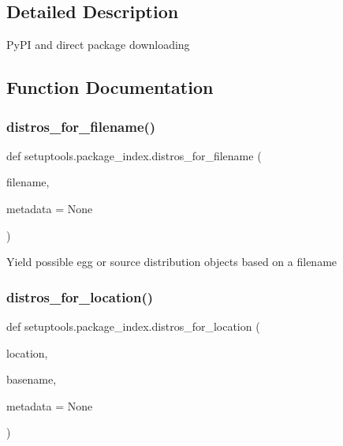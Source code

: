 \subsection{Detailed Description}
\begin{DoxyVerb}PyPI and direct package downloading\end{DoxyVerb}
 

\subsection{Function Documentation}
\mbox{\label{namespacesetuptools_1_1package__index_a2038c36ec69098c4da6c0fce1550f080}} 
\subsubsection{\texorpdfstring{distros\+\_\+for\+\_\+filename()}{distros\_for\_filename()}}
{\footnotesize\ttfamily def setuptools.\+package\+\_\+index.\+distros\+\_\+for\+\_\+filename (\begin{DoxyParamCaption}\item[{}]{filename,  }\item[{}]{metadata = {\ttfamily None} }\end{DoxyParamCaption})}

\begin{DoxyVerb}Yield possible egg or source distribution objects based on a filename\end{DoxyVerb}
 \mbox{\label{namespacesetuptools_1_1package__index_ad1cc6291d57604a866381df28930408a}} 
\subsubsection{\texorpdfstring{distros\+\_\+for\+\_\+location()}{distros\_for\_location()}}
{\footnotesize\ttfamily def setuptools.\+package\+\_\+index.\+distros\+\_\+for\+\_\+location (\begin{DoxyParamCaption}\item[{}]{location,  }\item[{}]{basename,  }\item[{}]{metadata = {\ttfamily None} }\end{DoxyParamCaption})}

